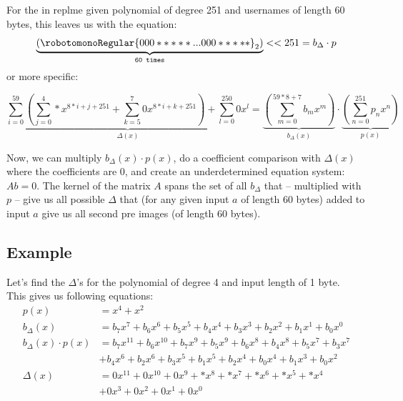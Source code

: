 \documentclass[10pt]{article}
\begin{document}
For the in replme given polynomial of degree 251 and usernames of length 60 bytes, this leaves us with the equation:
\begin{equation*}
	\underbrace{(\robotomonoRegular{000*****...000*****}_2)}_{\texttt{60 times}} << {251} = b_\Delta\cdot p
\end{equation*}
or more specific:

\begin{equation}
	\underbrace{\sum_{i=0}^{59}\left(\sum_{j=0}^{4}*x^{8*i+j+251}+\sum_{k=5}^{7}0x^{8*i+k+251}\right)+\sum_{l=0}^{250}0x^l}_{\Delta(x)} = \underbrace{\left(\sum_{m=0}^{59*8+7}b_mx^m\right)}_{b_\Delta(x)} \cdot \underbrace{\left(\sum_{n=0}^{251}p_nx^n\right)}_{p(x)}
\end{equation}

Now, we can multiply $b_\Delta(x)\cdot p(x)$, do a coefficient comparison with $\Delta(x)$ where the coefficients are $0$, and create an underdetermined equation system: $Ab=0$. The kernel of the matrix $A$ spans the set of all $b_\Delta$ that -- multiplied with $p$ -- give us all possible $\Delta$ that (for any given input $a$ of length 60 bytes) added to input $a$ give us all second pre images (of length 60 bytes). \\

\subsection{Example}

Let's find the $\Delta$'s for the polynomial  of degree 4 and input length of 1 byte. \\

This gives us following equations:
\begin{equation}
	\begin{aligned}
		p(x)                  & = x^4 + x^2                                                                               \\
		b_\Delta(x)           & = b_7x^7 + b_6x^6 + b_5x^5 + b_4x^4 + b_3x^3 + b_2x^2 + b_1x^1 + b_0x^0                   \\
		b_\Delta(x)\cdot p(x) & = b_7x^{11} + b_6x^{10} + b_7x^{9} + b_5x^{9} + b_6x^{8} + b_4x^{8} + b_5x^{7} + b_3x^{7} \\
		                      & + b_4x^{6} + b_2x^{6} + b_3x^{5} + b_1x^{5} +b_2x^{4} + b_0x^{4} + b_1x^{3} + b_0x^2      \\
		\Delta(x)             & = 0x^{11} + 0x^{10} + 0x^{9} + *x^{8} + *x^{7} + *x^{6} + *x^{5} + *x^{4}                 \\
		                      & + 0x^{3} + 0x^{2} + 0x^{1} + 0x^{0}
	\end{aligned}
\end{equation}
\end{document}
